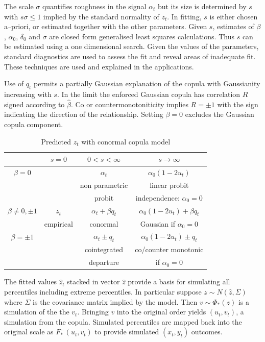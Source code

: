 \documentclass[authoryear]{elsarticle}
\begin{document}
The scale  $\sigma$ quantifies roughness in the signal $\alpha_t$ but its size is determined by $s$ with $s\sigma\le 1$ implied by the standard normality of $z_t$.   
In fitting, $s$ is either chosen a--priori, or estimated together with the other parameters. Given $s$, estimates of  $\beta$, $\alpha_0$, $\delta_0$ and $\sigma$ are closed form generalised least squares calculations.    Thus $s$ can be estimated  using a one dimensional search.   Given the values of the parameters,  standard diagnostics are used to assess the fit and reveal areas of inadequate fit.  These techniques are used and explained in the applications.



Use of $q_t$ permits  a partially Gaussian explanation of the copula with  Gaussianity increasing with $s$.   In the limit the enforced Gaussian copula has correlation $R$ signed according to $\hat\beta$.  Co or  countermonotoniticity implies $R=\pm 1$ with the sign indicating the direction of the relationship.  Setting $\beta=0$  excludes the Gaussian copula  component.



\begin{table}[htdp]
\caption{Predicted $z_t$ with conormal copula model}\label{ppp}
\begin{center}
\begin{tabular}{c||c|c|c}
\hline
&$s=0$& $0<s<\infty$ &$s\rightarrow\infty$\\
\hline\hline
$\beta=0$&& $\alpha_t$&$\alpha_0(1-2u_t)$ \\
& & non parametric& linear probit\\
& & probit & independence: $\alpha_0=0$ \\
\cline{1-1}\cline{3-4}
$\beta\ne 0,\pm 1$  & $z_t$ & $\alpha_t+\beta q_t$ &$\alpha_0(1-2u_t)+\beta q_t$\\
&empirical & conormal & Gaussian if $\alpha_0=0$\\
\cline{1-1}\cline{3-4}
$\beta=\pm 1$& & $\alpha_t\pm q_t$& $\alpha_0(1-2u_t)\pm q_t$ \\
& & cointegrated & co/counter monotonic \\
& & departure & if $\alpha_0=0$ \\
\hline
\end{tabular}
\end{center}
\end{table}%


The fitted values $\hat z_t$ stacked in  vector $\hat z$  provide a basis for simulating all percentiles including extreme percentiles.   In particular suppose $z\sim N(\hat z, \Sigma)$ where $\Sigma$ is the covariance matrix implied by the model.   Then $v\sim\Phi_*(z)$ is a simulation of the the $v_t$.   Bringing $v$ into the original order yields $(u_t,v_t)$, a simulation from the copula.  Simulated percentiles are  mapped back into the original scale as   $F_*^-(u_t,v_t)$ to provide simulated $(x_t,y_t)$ outcomes.  
\end{document}
